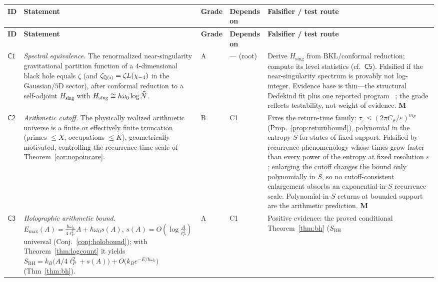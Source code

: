 \begin{longtable}{@{}p{}p{}p{}p{}p{}@{}}
\toprule
\textbf{ID} & \textbf{Statement} & \textbf{Grade} & \textbf{Depends on} & \textbf{Falsifier / test route}\\
\midrule
\endfirsthead
\toprule
\textbf{ID} & \textbf{Statement} & \textbf{Grade} & \textbf{Depends on} & \textbf{Falsifier / test route}\\
\midrule
\endhead
\bottomrule
\endfoot
$\mathsf{C1}$ &
\emph{Spectral equivalence.} The renormalized near-singularity gravitational partition
function of a $4$-dimensional black hole equals $\zeta$ (and $\zeta_{\mathbb{Q}(i)}=\zeta
L(\chi_{-4})$ in the Gaussian/$5$D sector), after conformal reduction to a self-adjoint
$H_{\mathrm{sing}}$ with $H_{\mathrm{sing}}\cong\hbar\omega_{0}\log\widehat{N}$. &
A &
--- (root) &
Derive $H_{\mathrm{sing}}$ from BKL/conformal reduction; compute its level statistics
(cf.\ $\mathsf{C5}$). Falsified if the near-singularity spectrum is provably not
log-integer. Evidence base is thin---the structural Dedekind fit plus one reported program
~\cite{hartnollyang2026}; the grade reflects testability, not weight of evidence. \textbf{M}\\
$\mathsf{C2}$ &
\emph{Arithmetic cutoff.} The physically realized arithmetic universe is a finite or
effectively finite truncation (primes $\leq X$, occupations $\leq K$), geometrically
motivated, controlling the recurrence-time scale of Theorem~\ref{cor:nopoincare}. &
B &
C1 &
Fixes the return-time family: $\tau_{\varepsilon}\leq(2\pi C_{F}/\varepsilon)^{m_{F}}$
(Prop.~\ref{prop:returnbound}), polynomial in the entropy $S$ for states of fixed support.
Falsified by recurrence phenomenology whose times grow faster than every power of the
entropy at fixed resolution $\varepsilon$: enlarging the cutoff changes the bound only
polynomially in $S$, so no cutoff-consistent enlargement absorbs an exponential-in-$S$
recurrence scale. Polynomial-in-$S$ returns at bounded support are the arithmetic
prediction. \textbf{M}\\
$\mathsf{C3}$ &
\emph{Holographic arithmetic bound.} $E_{\max}(A)=\frac{\hbar\omega_{0}}{4\ell_{P}^{2}}A+\hbar\omega_{0}s(A)$,
$s(A)=O(\log\frac{A}{\ell_{P}^{2}})$ universal (Conj.~\ref{conj:holobound}); with
Theorem~\ref{thm:logcount} it yields
$S_{\mathrm{BH}}=k_{B}\bigl(A/4\ell_{P}^{2}+s(A)\bigr)+O\bigl(k_{B}e^{-E/\hbar\omega_{0}}\bigr)$ (Thm~\ref{thm:bh}). &
A &
C1 &
Positive evidence: the proved conditional Theorem~\ref{thm:bh} ($S_{\mathrm{BH}}$

\end{longtable}
